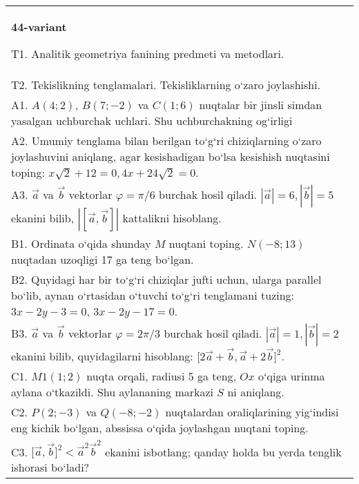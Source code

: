 \documentclass{article}
\begin{document}
\begin{tabular}{m{17cm}}
\textbf{44-variant}
\newline

T1. Analitik geometriya fanining predmeti va metodlari.
 \\
T2. 
Tekislikning tenglamalari. Tekisliklarning o‘zaro joylashishi.
 \\
A1. 
$A (4;2) $, $B (7;-2) $ va $C (1;6) $ nuqtalar bir jinsli
simdan yasalgan uchburchak uchlari. Shu uchburchakning og‘irligi
 \\
A2. 
Umumiy tenglama bilan berilgan to‘g‘ri chiziqlarning
o‘zaro joylashuvini aniqlang, agar kesishadigan bo‘lsa kesishish nuqtasini
toping: $x\sqrt{2}+12=0, 4x+24\sqrt{2}=0$.
 \\
A3. 
$\overrightarrow{a}$ va $\overrightarrow{b}$ vektorlar
$\varphi = \pi/6$ burchak hosil qiladi.
$|\overrightarrow{a}| = 6,|\overrightarrow{b}| = 5$ ekanini bilib,
$\left| \left\lbrack \overrightarrow{a},\overrightarrow{b} \right\rbrack \right|$ kattalikni hisoblang.
 \\
B1. 
Ordinata o‘qida shunday $M$ nuqtani toping.
\(N (-8;13) \) nuqtadan uzoqligi 17 ga teng bo‘lgan.
 \\
B2. 
Quyidagi har bir to‘g‘ri chiziqlar jufti uchun, ularga parallel
bo‘lib, aynan o‘rtasidan o‘tuvchi to‘g‘ri tenglamani tuzing: $3x-2y-3=0$, $3x-2y-17=0$.
 \\
B3. 
$\vec{a}$ va $\vec{b}$ vektorlar $\varphi = 2\pi/3$ burchak hosil qiladi. $|\vec{a}| = 1,|\vec{b}| = 2$ ekanini bilib, quyidagilarni hisoblang:
$\lbrack 2\overrightarrow{a} + \overrightarrow{b},\overrightarrow{a} + 2\overrightarrow{b}\rbrack^{2}$.
 \\
C1. 
\(M{1} (1; 2) \) nuqta orqali, radiusi 5 ga teng,
$Ox$ o‘qiga urinma aylana o‘tkazildi. Shu aylananing markazi
$S$ ni aniqlang.
 \\
C2. 
\(P (2; - 3) \) va \(Q (- 8; - 2) \) nuqtalardan
oraliqlarining yig‘indisi eng kichik bo‘lgan, abssissa o‘qida joylashgan
nuqtani toping.
 \\
C3. 
\(\lbrack\vec{a},\vec{b}\rbrack^{2} < {\vec{a}}^{2}{\vec{b}}^{2}\) ekanini isbotlang; qanday holda bu yerda tenglik ishorasi bo‘ladi?
 \\

\end{tabular}
\vspace{1cm}
\end{document}
